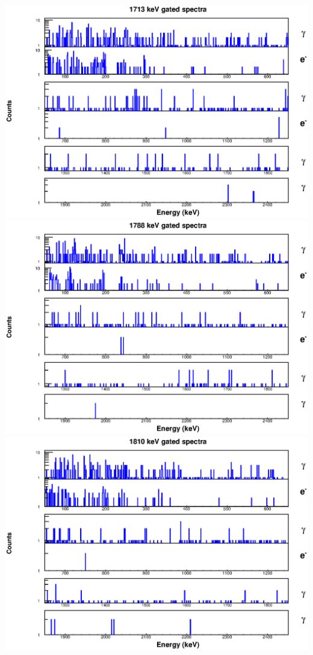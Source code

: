 \begin{landscape}
\includegraphics[scale=1.1]{154Gd_Appendix/1713_combined.eps}
\includegraphics[scale=1.1]{154Gd_Appendix/1788_combined.eps}
\includegraphics[scale=1.1]{154Gd_Appendix/1810_combined.eps}

\end{landscape}
